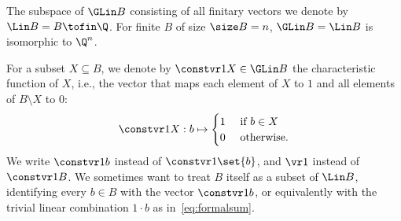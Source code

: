 %
The subspace of $\GLin B$ consisting of all finitary vectors we denote by $\Lin B = B\tofin\Q$.
For finite $B$ of size $\size B = n$, $\GLin B = \Lin B$ is isomorphic to $\Q^{n}$.
%

For a subset $X\subseteq B$, we denote by $\constvr 1 X\in\GLin B$ the characteristic function of $X$,
i.e., the vector that maps each element of  $X$ to $1$ and all elements of $B\setminus X$ to $0$:
\[
\constvr 1 X : b \mapsto \begin{cases}
1 & \text{ if } b \in X \\
0 & \text{ otherwise.}
\end{cases} 
\]
We write $\constvr 1 b$ instead of $\constvr 1 {\set{b}}$, and $\vr 1$ instead of $\constvr 1 B$.
We sometimes want to treat $B$ itself as a subset of $\Lin B$, identifying every $b\in B$ with
the vector $\constvr 1 b$, or equivalently with
the trivial linear combination $1\cdot b$ as in~\eqref{eq:formalsum}.
%



